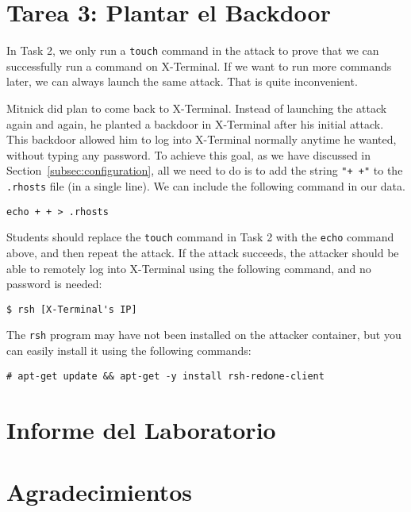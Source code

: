 \section{Tarea 3: Plantar el Backdoor}

In Task 2, we only run a \texttt{touch} command in the attack to prove that we can
successfully run a command on X-Terminal. If we want to run
more commands later, we can always launch the same attack. That is quite inconvenient. 

Mitnick did plan to come back to X-Terminal. Instead of launching the attack
again and again, he planted a backdoor in X-Terminal after his initial attack. 
This backdoor allowed him to log into X-Terminal normally anytime he wanted, without 
typing any password. 
To achieve this goal, as we have discussed in 
Section~\ref{subsec:configuration}, 
all we need to do is to add the string \texttt{"+ +"} to
the \texttt{.rhosts} file (in a single line). We can
include the following command in our \rsh data.

\begin{lstlisting}
echo + + > .rhosts
\end{lstlisting}

Students should replace the \texttt{touch} command in Task 2 with
the \texttt{echo} command above, and then repeat the attack.   
If the attack succeeds, the attacker should be able to 
remotely log into X-Terminal using the following command,
and no password is needed: 

\begin{lstlisting}
$ rsh [X-Terminal's IP]
\end{lstlisting}

The \texttt{rsh} program may have not been installed on the attacker container, 
but you can easily install it using the following commands:

\begin{lstlisting}
# apt-get update && apt-get -y install rsh-redone-client 
\end{lstlisting}


\section{Informe del Laboratorio}




\section*{Agradecimientos}










